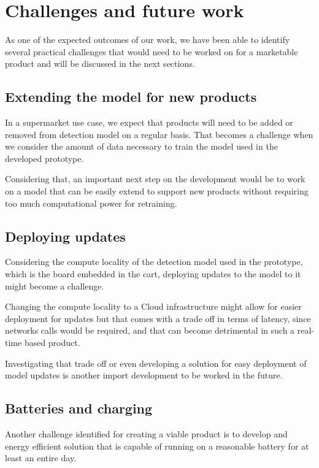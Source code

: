 \documentclass[openright]{normas-utf-tex} %
\begin{document}
\section{Challenges and future work}

As one of the expected outcomes of our work, we have been able to identify
several practical challenges that would need to be worked on for a marketable
product and will be discussed in the next sections.

\subsection{Extending the model for new products}
In a supermarket use case, we expect that products will need to be added or
removed from detection model on a regular basis. That becomes a challenge when
we consider the amount of data necessary to train the model used in the
developed prototype.

Considering that, an important next step on the development would be to work on
a model that can be easily extend to support new products without requiring too
much computational power for retraining.

\subsection{Deploying updates}

Considering the compute locality of the detection model used in the prototype,
which is the board embedded in the cart, deploying updates to the model to it
might become a challenge.

Changing the compute locality to  a Cloud infrastructure \cite{Aws2022} might
allow for easier deployment for updates but that comes with a trade off in
terms of latency, since networks calls would be required, and that can become
detrimental in such a real-time based product.

Investigating that trade off or even developing a solution for easy deployment
of model updates is another import development to be worked in the future. 

\subsection{Batteries and charging}

Another challenge identified for creating a viable product is to develop and
energy efficient solution that is capable of running on a reasonable battery
for at least an entire day.
\end{document}
